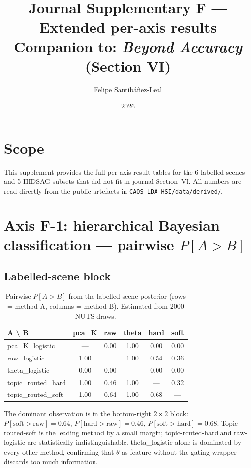 \documentclass[11pt,a4paper]{article}
\title{Journal Supplementary F --- Extended per-axis results\\
{\large Companion to: \emph{Beyond Accuracy} (Section VI)}}
\author{Felipe Santib\'a\~nez-Leal}
\date{2026}
\begin{document}
\maketitle

\section{Scope}
This supplement provides the full per-axis result tables for the 6
labelled scenes and 5 HIDSAG subsets that did not fit in journal
Section~VI. All numbers are read directly from the public artefacts
in \texttt{CAOS\_LDA\_HSI/data/derived/}.

\section{Axis F-1: hierarchical Bayesian classification --- pairwise $P[A>B]$}

\subsection{Labelled-scene block}

\begin{table}[h]
\caption{Pairwise $P[A > B]$ from the labelled-scene posterior (rows
= method A, columns = method B). Estimated from 2000 NUTS draws.}
\label{tab:b1-pair-labelled}
\centering
\small
\begin{tabular}{l c c c c c}
\toprule
A \textbackslash{} B & pca\_K & raw & theta & hard & soft \\
\midrule
pca\_K\_logistic    & ---   & 0.00 & 1.00 & 0.00  & 0.00  \\
raw\_logistic       & 1.00 & ---   & 1.00 & 0.54  & 0.36  \\
theta\_logistic     & 0.00 & 0.00 & ---   & 0.00  & 0.00  \\
topic\_routed\_hard & 1.00 & 0.46 & 1.00 & ---    & 0.32  \\
topic\_routed\_soft & 1.00 & 0.64 & 1.00 & 0.68   & ---    \\
\bottomrule
\end{tabular}
\end{table}

The dominant observation is in the bottom-right $2 \times 2$ block:
$P[\text{soft} > \text{raw}] = 0.64$, $P[\text{hard} > \text{raw}] =
0.46$, $P[\text{soft} > \text{hard}] = 0.68$. Topic-routed-soft is
the leading method by a small margin; topic-routed-hard and
raw-logistic are statistically indistinguishable. theta\_logistic
alone is dominated by every other method, confirming that
$\theta$-as-feature without the gating wrapper discards too much
information.
\end{document}
